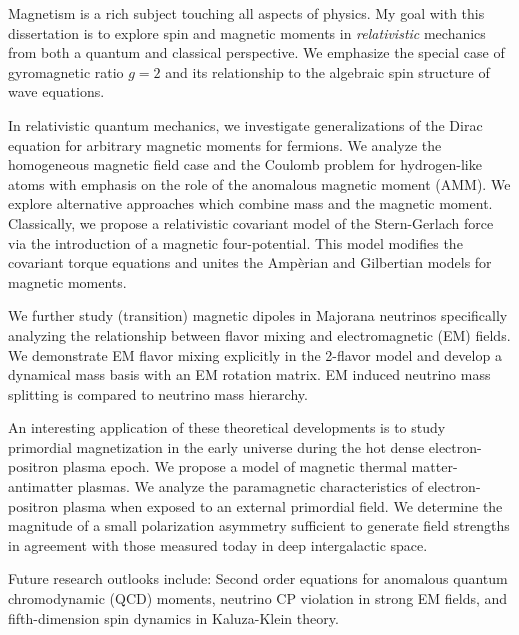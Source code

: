 

Magnetism is a rich subject touching all aspects of physics. My goal with this dissertation is to explore spin and magnetic moments in \emph{relativistic} mechanics from both a quantum and classical perspective. We emphasize the special case of gyromagnetic ratio $g\!=\!2$ and its relationship to the algebraic spin structure of wave equations.

In relativistic quantum mechanics, we investigate generalizations of the Dirac equation for arbitrary magnetic moments for fermions. We analyze the homogeneous magnetic field case and the Coulomb problem for hydrogen-like atoms with emphasis on the role of the anomalous magnetic moment (AMM). We explore alternative approaches which combine mass and the magnetic moment. Classically, we propose a relativistic covariant model of the Stern-Gerlach force via the introduction of a magnetic four-potential. This model modifies the covariant torque equations and unites the Amp{\`e}rian and Gilbertian models for magnetic moments.

We further study (transition) magnetic dipoles in Majorana neutrinos specifically analyzing the relationship between flavor mixing and electromagnetic (EM) fields. We demonstrate EM flavor mixing explicitly in the 2-flavor model and develop a dynamical mass basis with an EM rotation matrix. EM induced neutrino mass splitting is compared to neutrino mass hierarchy.

An interesting application of these theoretical developments is to study primordial magnetization in the early universe during the hot dense electron-positron plasma epoch. We propose a model of magnetic thermal matter-antimatter plasmas. We analyze the paramagnetic characteristics of electron-positron plasma when exposed to an external primordial field. We determine the magnitude of a small polarization asymmetry sufficient to generate field strengths in agreement with those measured today in deep intergalactic space.

Future research outlooks include: Second order equations for anomalous quantum chromodynamic (QCD) moments, neutrino CP violation in strong EM fields, and fifth-dimension spin dynamics in Kaluza-Klein theory.
